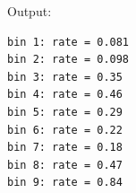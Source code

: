 Output:

\begin{lstlisting}
bin 1: rate = 0.081
bin 2: rate = 0.098
bin 3: rate = 0.35
bin 4: rate = 0.46
bin 5: rate = 0.29
bin 6: rate = 0.22
bin 7: rate = 0.18
bin 8: rate = 0.47
bin 9: rate = 0.84
\end{lstlisting}


